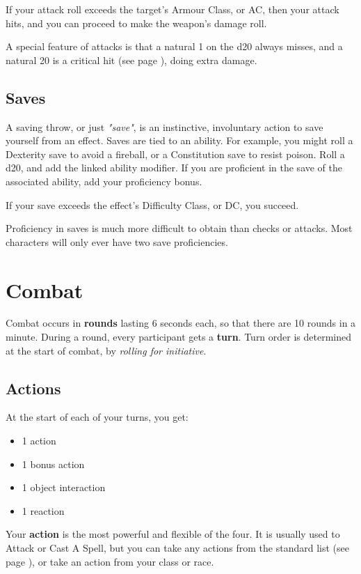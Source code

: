 \documentclass[letterpaper,twocolumn,openany,nodeprecatedcode,bg=print]{dndbook}
\newcommand{\pg}[1]{page \pageref{#1}}
\newcommand{\see}[1]{(see \pg{#1})}
\begin{document}
If your attack roll exceeds the target's Armour Class, or AC, then your attack hits, and you can proceed to make the weapon's damage roll.

A special feature of attacks is that a natural 1 on the d20 always misses, and a natural 20 is a critical hit \see{critical-hit}, doing extra damage.

\subsection{Saves}
A saving throw, or just \textit{"save"}, is an instinctive, involuntary action to save yourself from an effect. Saves are tied to an ability. For example, you might roll a Dexterity save to avoid a fireball, or a Constitution save to resist poison. Roll a d20, and add the linked ability modifier. If you are proficient in the save of the associated ability, add your proficiency bonus.

If your save exceeds the effect's Difficulty Class, or DC, you succeed.

Proficiency in saves is much more difficult to obtain than checks or attacks. Most characters will only ever have two save proficiencies.





\section{Combat}
Combat occurs in \textbf{rounds} lasting 6 seconds each, so that there are 10 rounds in a minute. During a round, every participant gets a \textbf{turn}. Turn order is determined at the start of combat, by \textit{rolling for initiative}.

\subsection{Actions}
At the start of each of your turns, you get:

\begin{itemize}
\item 1 action
\item 1 bonus action
\item 1 object interaction
\item 1 reaction
\end{itemize}

Your \textbf{action} is the most powerful and flexible of the four. It is usually used to Attack or Cast A Spell, but you can take any actions from the standard list \see{combat-options}, or take an action from your class or race.
\end{document}

